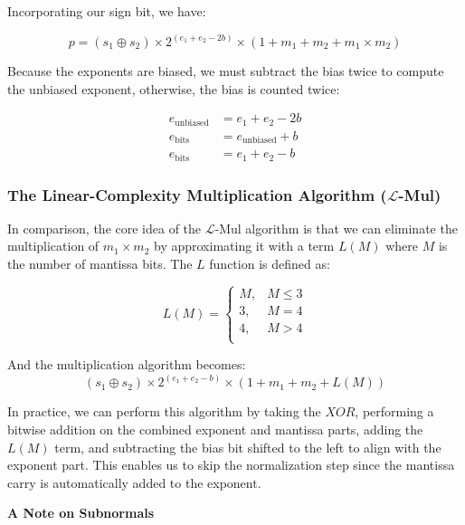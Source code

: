 \documentclass[12pt,letterpaper]{article}
\newcommand{\lmul}{$\mathcal{L}$-Mul\xspace}
\begin{document}
Incorporating our sign bit, we have:

\begin{equation*}
    p = (s_1 \oplus s_2) \times 2^{\textstyle (e_1+e_2-2b)} \times (1+m_1+m_2+m_1 \times m_2)
\end{equation*}

Because the exponents are biased, we must subtract the bias twice to compute the unbiased exponent, otherwise, the bias is counted twice:

\begin{align*}
    e_{\text{unbiased}} &= e_1 + e_2 - 2b \\
    e_{\text{bits}} &= e_{\text{unbiased}} + b \\
    e_{\text{bits}} &= e_1 + e_2 - b
\end{align*}

\subsubsection*{The Linear-Complexity Multiplication Algorithm (\lmul)}

In comparison, the core idea of the \lmul algorithm is that we can eliminate the multiplication of $m_1 \times m_2$ by approximating it with a term $L(M)$ where $M$ is the number of mantissa bits. The $L$ function is defined as:

\begin{equation*}
 L(M) =
   \left\{\begin{array}{lr}
       M, & M \le 3 \\
       3, & M = 4 \\
       4, & M > 4 \\
    \end{array}\right.
 \end{equation*}

And the multiplication algorithm becomes:  
$$
(s_1 \oplus s_2) \times 2^{\textstyle (e_1+e_2-b)} \times (1+m_1+m_2+L(M))
$$

In practice, we can perform this algorithm by taking the $XOR$, performing a bitwise addition on the combined exponent and mantissa parts, adding the $L(M)$ term, and subtracting the bias bit shifted to the left to align with the exponent part. This enables us to skip the normalization step since the mantissa carry is automatically added to the exponent.

\vspace{1em}

\textbf{A Note on Subnormals}
\end{document}
